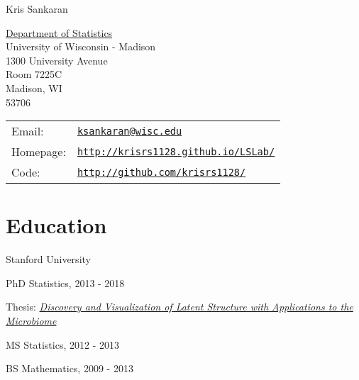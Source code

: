 \documentclass[letterpaper]{article}
\def\name{Kris Sankaran}
\renewenvironment{itemize}{
  \begin{list}{}{
    \setlength{\leftmargin}{1.5em}
  }
}{
  \end{list}
}
\begin{document}
{\huge \name}


\vspace{0.25in}

\begin{minipage}{0.45\linewidth}
  \href{https://stat.wisc.edu/}{Department of Statistics} \\
  University of Wisconsin - Madison \\
  1300 University Avenue \\
  Room 7225C \\
  Madison, WI \\
  53706
\end{minipage}
\begin{minipage}{0.45\linewidth}
  \begin{tabular}{ll}
    Email: & \href{mailto:ksankaran@wisc.edu}{\tt ksankaran@wisc.edu} \\
    Homepage: & \href{http://krisrs1128.github.io/LSLab/}{\tt http://krisrs1128.github.io/LSLab/} \\
    Code: & \href{http://github.com/krisrs1128/}{\tt http://github.com/krisrs1128/} \\
  \end{tabular}
\end{minipage}

\section*{Education}
Stanford University
\begin{itemize}
  \item PhD Statistics, 2013 - 2018
    \begin{itemize}
    \item Thesis: \textit{\href{https://searchworks.stanford.edu/view/12375828}{Discovery and Visualization of Latent Structure with Applications to the Microbiome}}
    \end{itemize}
  \item MS Statistics, 2012 - 2013
  \item BS Mathematics, 2009 - 2013
\end{itemize}
\end{document}
